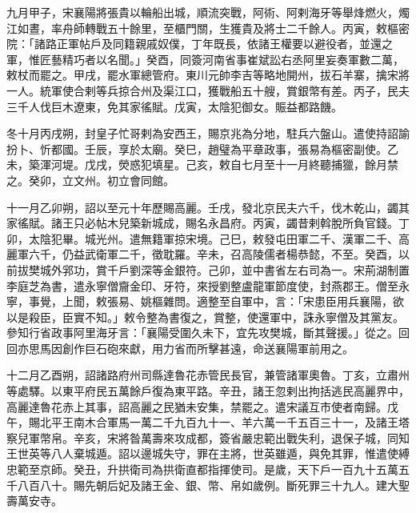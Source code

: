 \begin{pinyinscope}
 九月甲子，宋襄陽將張貴以輪船出城，順流突戰，阿術、阿剌海牙等舉烽燃火，燭江如晝，率舟師轉戰五十餘里，至櫃門關，生獲貴及將士二千餘人。丙寅，敕樞密院：「諸路正軍帖戶及同籍親戚奴僕，丁年既長，依諸王權要以避役者，並還之軍，惟匠藝精巧者以名聞。」癸酉，同簽河南省事崔斌訟右丞阿里妄奏軍數二萬，敕杖而罷之。甲戌，罷水軍總管府。東川元帥李吉等略地開州，拔石羊寨，擒宋將一人。統軍使合剌等兵掠合州及渠江口，獲戰船五十艘，賞銀幣有差。丙子，民夫三千人伐巨木遼東，免其家徭賦。戊寅，太陰犯御女。賑益都路饑。



 冬十月丙戌朔，封皇子忙哥剌為安西王，賜京兆為分地，駐兵六盤山。遣使持詔諭扮卜、忻都國。壬辰，享於太廟。癸巳，趙璧為平章政事，張易為樞密副使。乙未，築渾河堤。戊戌，熒惑犯填星。己亥，敕自七月至十一月終聽捕獵，餘月禁之。癸卯，立文州。初立會同館。



 十一月乙卯朔，詔以至元十年歷賜高麗。壬戌，發北京民夫六千，伐木乾山，蠲其家徭賦。諸王只必帖木兒築新城成，賜名永昌府。丙寅，蠲昔剌斡脫所負官錢。丁卯，太陰犯畢。城光州。遣無籍軍掠宋境。己巳，敕發屯田軍二千、漢軍二千、高麗軍六千，仍益武衛軍二千，徵耽羅。辛未，召高陵儒者楊恭懿，不至。癸酉，以前拔樊城外郛功，賞千戶劉深等金銀符。己卯，並中書省左右司為一。宋荊湖制置李庭芝為書，遣永寧僧齎金印、牙符，來授劉整盧龍軍節度使，封燕郡王。僧至永寧，事覺，上聞，敕張易、姚樞雜問。適整至自軍中，言：「宋患臣用兵襄陽，欲以是殺臣，臣實不知。」敕令整為書復之，賞整，使還軍中，誅永寧僧及其黨友。參知行省政事阿里海牙言：「襄陽受圍久未下，宜先攻樊城，斷其聲援。」從之。回回亦思馬因創作巨石砲來獻，用力省而所擊甚遠，命送襄陽軍前用之。



 十二月乙酉朔，詔諸路府州司縣達魯花赤管民長官，兼管諸軍奧魯。丁亥，立肅州等處驛。以東平府民五萬餘戶復為東平路。辛丑，諸王忽剌出拘括逃民高麗界中，高麗達魯花赤上其事，詔高麗之民猶未安集，禁罷之。遣宋議互市使者南歸。戊午，賜北平王南木合軍馬一萬二千九百九十一、羊六萬一千五百三十一，及諸王塔察兒軍幣帛。辛亥，宋將昝萬壽來攻成都，簽省嚴忠範出戰失利，退保子城，同知王世英等八人棄城遁。詔以邊城失守，罪在主將，世英雖遁，與免其罪，惟遣使縛忠範至京師。癸丑，升拱衛司為拱衛直都指揮使司。是歲，天下戶一百九十五萬五千八百八十。賜先朝后妃及諸王金、銀、幣、帛如歲例。斷死罪三十九人。建大聖壽萬安寺。



\end{pinyinscope}